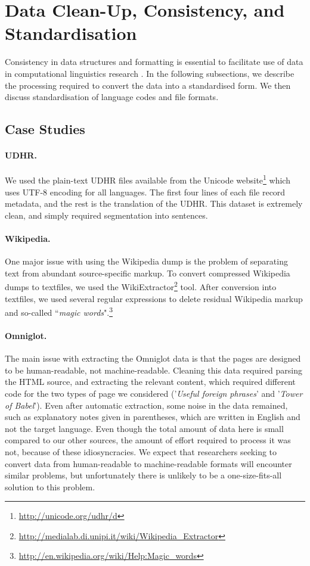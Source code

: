 \section{Data Clean-Up, Consistency, and Standardisation} \label{sec:case_studies}
Consistency in data structures and formatting is essential to facilitate use of data in computational linguistics research \cite{palmer2010lilt}. In the following subsections, we describe the processing required to convert the data into a standardised form.  We then discuss standardisation of language codes and file formats.

\subsection{Case Studies}


\paragraph{UDHR.} We used the plain-text UDHR files available from the Unicode website\footnote{\url{http://unicode.org/udhr/d}} which uses UTF-8 encoding for all languages. The first four lines of each file record metadata, and the rest is the translation of the UDHR. This dataset is extremely clean, and simply required segmentation into sentences.


\paragraph{Wikipedia.}
One major issue with using the Wikipedia dump is the problem of separating text from abundant source-specific markup. To convert compressed Wikipedia dumps to textfiles, we used the WikiExtractor\footnote{\url{http://medialab.di.unipi.it/wiki/Wikipedia_Extractor}} tool. After conversion into textfiles, we used several regular expressions to delete residual Wikipedia markup and so-called ``\emph{magic words}".\footnote{\url{http://en.wikipedia.org/wiki/Help:Magic_words}}


\paragraph{Omniglot.}
The main issue with extracting the Omniglot data is that the pages are designed to be human-readable, not machine-readable.  Cleaning this data required parsing the HTML source, and extracting the relevant content, which required different code for the two types of page we considered ('\emph{Useful foreign phrases}' and '\emph{Tower of Babel}').  Even after automatic extraction, some noise in the data remained, such as explanatory notes given in parentheses, which are written in English and not the target language.  Even though the total amount of data here is small compared to our other sources, the amount of effort required to process it was not, because of these idiosyncracies.  We expect that researchers seeking to convert data from human-readable to machine-readable formats will encounter similar problems, but unfortunately there is unlikely to be a one-size-fits-all solution to this problem.


